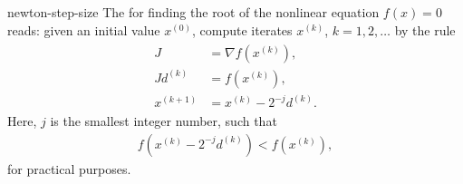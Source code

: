 \begin{Definition}{newton-step-size}
  The  for finding the
  root of the nonlinear equation $f(x) = 0$ reads: given an initial
  value $x^{(0)}$, compute iterates $x^{(k)}$, $k=1,2,\ldots$ by the
  rule
  \begin{gather}
    \label{eq:newton-step-size:1}
    \begin{split}
      J &= \nabla f\left(x^{(k)}\right),
      \\
      J d^{(k)} &= f(x^{(k)}),
      \\
      x^{(k+1)} &= x^{(k)} - 2^{-j} d^{(k)}.
    \end{split}
  \end{gather}
  Here, $j$ is the smallest integer number, such that
  \begin{gather}
    \label{eq:newton-step-size:2}
    f(x^{(k)} - 2^{-j} d^{(k)}) < f(x^{(k)}),
  \end{gather}
  for practical purposes.
\end{Definition}

